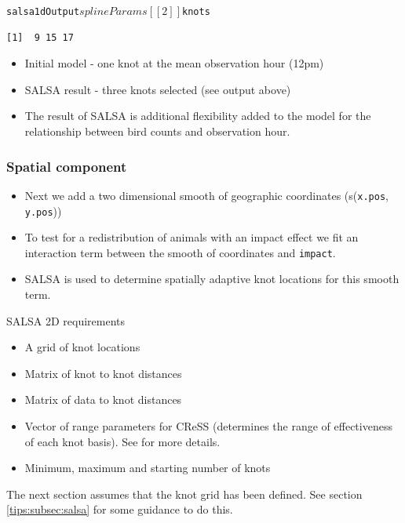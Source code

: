 \begin{frame}[fragile]
\begin{knitrout}\footnotesize
{}\color{fgcolor}\begin{kframe}
\begin{alltt}
salsa1dOutput$splineParams[[2]]$knots
\end{alltt}
\begin{verbatim}
[1]  9 15 17
\end{verbatim}
\end{kframe}
\end{knitrout}

\begin{itemize}
\item Initial model - one knot at the mean observation hour (12pm) 
\item SALSA result - three knots selected (see output above)
\item The result of SALSA is additional flexibility added to the model for the relationship between bird counts and observation hour.
\end{itemize}
\end{frame}

\begin{frame}[fragile]
\frametitle{Spatial component}
\begin{itemize}
\item Next we add a two dimensional smooth of geographic coordinates (s({\tt x.pos}, {\tt y.pos}))
\item To test for a redistribution of animals with an impact effect we fit an interaction term between the smooth of coordinates and {\tt impact}.
\item SALSA is used to determine spatially adaptive knot locations for this smooth term.
\end{itemize}
\end{frame}

\begin{frame}
\begin{block}{SALSA 2D requirements}
\begin{itemize}
\item A grid of knot locations
\item Matrix of knot to knot distances 
\item Matrix of data to knot distances
\item Vector of range parameters for CReSS (determines the range of effectiveness of each knot basis).  See \citep{ScottH2013} for more details.
\item Minimum, maximum and starting number of knots
\end{itemize}
\end{block}
\noindent The next section assumes that the knot grid has been defined. See section \ref{tips:subsec:salsa} for some guidance to do this.
\end{frame}

